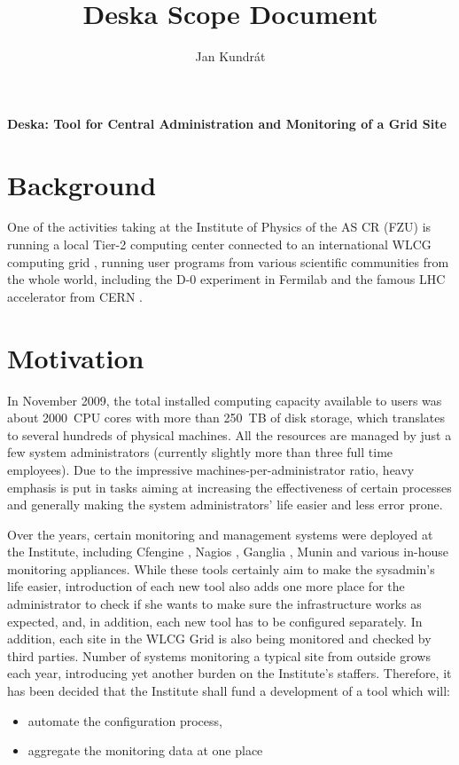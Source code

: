\documentclass[12pt]{article}
\author{Jan Kundrát}
\title{Deska Scope Document}
\begin{document}
{\huge \textbf{Deska: Tool for Central Administration and Monitoring of a Grid Site}}

\vspace{0.5in}

\section{Background}

One of the activities taking at the Institute of Physics of the AS CR (FZU) \cite{fzu} is running a local Tier-2 computing center
connected to an international WLCG computing grid \cite{wlcg}, running user programs from various scientific communities from the
whole world, including the D-0 experiment in Fermilab \cite{d0} and the famous LHC accelerator from CERN \cite{lhc}.

\section{Motivation}

In November 2009, the total installed computing capacity available to users was about 2000~CPU cores with more than 250~TB of
disk storage, which translates to several hundreds of physical machines.  All the resources are managed by just a few system
administrators (currently slightly more than three full time employees).  Due to the impressive machines-per-administrator ratio,
heavy emphasis is put in tasks aiming at increasing the effectiveness of certain processes and generally making the system
administrators' life easier and less error prone.

Over the years, certain monitoring and management systems were deployed at the Institute, including Cfengine \cite{cfengine},
Nagios \cite{nagios}, Ganglia \cite{ganglia}, Munin \cite{munin} and various in-house monitoring appliances.  While these tools
certainly aim to make the sysadmin's life easier, introduction of each new tool also adds one more place for the administrator to
check if she wants to make sure the infrastructure works as expected, and, in addition, each new tool has to be configured
separately.  In addition, each site in the WLCG Grid is also being monitored and checked by third parties.  Number of systems
monitoring a typical site from outside grows each year, introducing yet another burden on the Institute's staffers.  Therefore, it
has been decided that the Institute shall fund a development of a tool which will:

\begin{itemize}
    \item{automate the configuration process,}
    \item{aggregate the monitoring data at one place}
\end{itemize}
\end{document}
